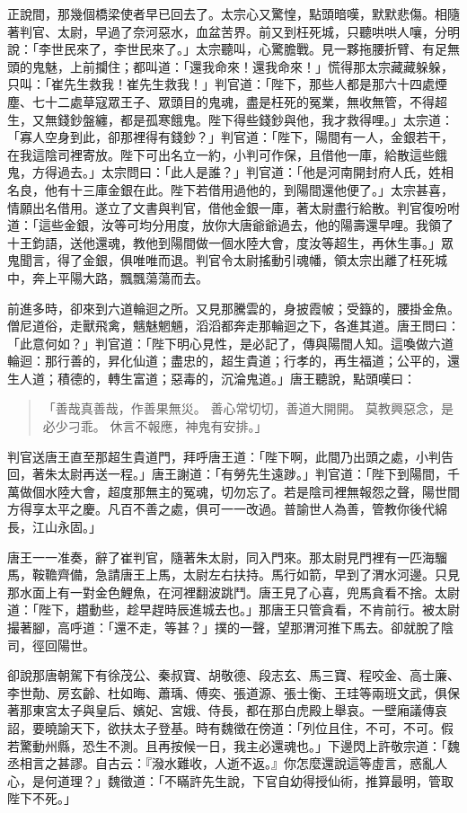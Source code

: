 正說間，那幾個橋梁使者早已回去了。太宗心又驚惶，點頭暗嘆，默默悲傷。相隨著判官、太尉，早過了奈河惡水，血盆苦界。前又到枉死城，只聽哄哄人嚷，分明說：「李世民來了，李世民來了。」太宗聽叫，心驚膽戰。見一夥拖腰折臂、有足無頭的鬼魅，上前攔住；都叫道：「還我命來！還我命來！」慌得那太宗藏藏躲躲，只叫：「崔先生救我！崔先生救我！」判官道：「陛下，那些人都是那六十四處煙塵、七十二處草寇眾王子、眾頭目的鬼魂，盡是枉死的冤業，無收無管，不得超生，又無錢鈔盤纏，都是孤寒餓鬼。陛下得些錢鈔與他，我才救得哩。」太宗道：「寡人空身到此，卻那裡得有錢鈔？」判官道：「陛下，陽間有一人，金銀若干，在我這陰司裡寄放。陛下可出名立一約，小判可作保，且借他一庫，給散這些餓鬼，方得過去。」太宗問曰：「此人是誰？」判官道：「他是河南開封府人氏，姓相名良，他有十三庫金銀在此。陛下若借用過他的，到陽間還他便了。」太宗甚喜，情願出名借用。遂立了文書與判官，借他金銀一庫，著太尉盡行給散。判官復吩咐道：「這些金銀，汝等可均分用度，放你大唐爺爺過去，他的陽壽還早哩。我領了十王鈞語，送他還魂，教他到陽間做一個水陸大會，度汝等超生，再休生事。」眾鬼聞言，得了金銀，俱唯唯而退。判官令太尉搖動引魂幡，領太宗出離了枉死城中，奔上平陽大路，飄飄蕩蕩而去。

前進多時，卻來到六道輪迴之所。又見那騰雲的，身披霞帔；受籙的，腰掛金魚。僧尼道俗，走獸飛禽，魑魅魍魎，滔滔都奔走那輪迴之下，各進其道。唐王問曰：「此意何如？」判官道：「陛下明心見性，是必記了，傳與陽間人知。這喚做六道輪迴：那行善的，昇化仙道；盡忠的，超生貴道；行孝的，再生福道；公平的，還生人道；積德的，轉生富道；惡毒的，沉淪鬼道。」唐王聽說，點頭嘆曰：
\begin{quote}
「善哉真善哉，作善果無災。
善心常切切，善道大開開。
莫教興惡念，是必少刁乖。
休言不報應，神鬼有安排。」
\end{quote}

判官送唐王直至那超生貴道門，拜呼唐王道：「陛下啊，此間乃出頭之處，小判告回，著朱太尉再送一程。」唐王謝道：「有勞先生遠踄。」判官道：「陛下到陽間，千萬做個水陸大會，超度那無主的冤魂，切勿忘了。若是陰司裡無報怨之聲，陽世間方得享太平之慶。凡百不善之處，俱可一一改過。普諭世人為善，管教你後代綿長，江山永固。」

唐王一一准奏，辭了崔判官，隨著朱太尉，同入門來。那太尉見門裡有一匹海騮馬，鞍韂齊備，急請唐王上馬，太尉左右扶持。馬行如箭，早到了渭水河邊。只見那水面上有一對金色鯉魚，在河裡翻波跳鬥。唐王見了心喜，兜馬貪看不捨。太尉道：「陛下，趲動些，趁早趕時辰進城去也。」那唐王只管貪看，不肯前行。被太尉撮著腳，高呼道：「還不走，等甚？」撲的一聲，望那渭河推下馬去。卻就脫了陰司，徑回陽世。

卻說那唐朝駕下有徐茂公、秦叔寶、胡敬德、段志玄、馬三寶、程咬金、高士廉、李世勣、房玄齡、杜如晦、蕭瑀、傅奕、張道源、張士衡、王珪等兩班文武，俱保著那東宮太子與皇后、嬪妃、宮娥、侍長，都在那白虎殿上舉哀。一壁廂議傳哀詔，要曉諭天下，欲扶太子登基。時有魏徵在傍道：「列位且住，不可，不可。假若驚動州縣，恐生不測。且再按候一日，我主必還魂也。」下邊閃上許敬宗道：「魏丞相言之甚謬。自古云：『潑水難收，人逝不返。』你怎麼還說這等虛言，惑亂人心，是何道理？」魏徵道：「不瞞許先生說，下官自幼得授仙術，推算最明，管取陛下不死。」

